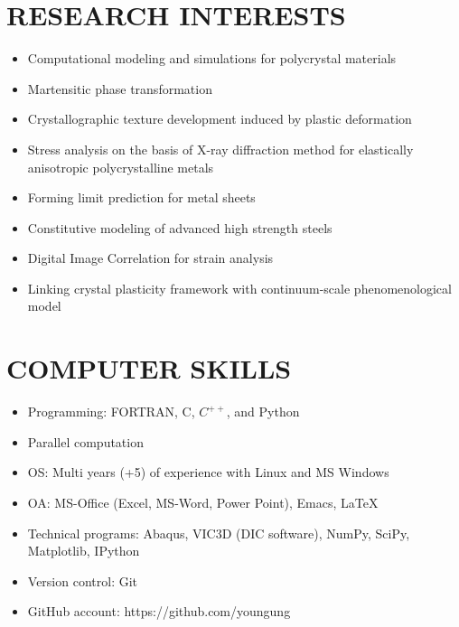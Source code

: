 \documentclass{res}
\begin{document}
\begin{resume}
  \section{RESEARCH INTERESTS}
  \begin{itemize}
  \item Computational modeling and simulations for polycrystal materials
  \item Martensitic phase transformation
  \item Crystallographic texture development induced by plastic deformation
  \item Stress analysis on the basis of X-ray diffraction method for elastically anisotropic polycrystalline metals
  \item Forming limit prediction for metal sheets
  \item Constitutive modeling of advanced high strength steels
  \item Digital Image Correlation for strain analysis
  \item Linking crystal plasticity framework with continuum-scale phenomenological model
  \end{itemize}

  \section{COMPUTER SKILLS}
  \begin{itemize}
  \item Programming: FORTRAN, C, $C^{++}$, and Python
  \item Parallel computation
  \item OS: Multi years (+5) of experience with Linux and MS Windows
  \item OA: MS-Office (Excel, MS-Word, Power Point), Emacs, \LaTeX
  \item Technical programs: Abaqus, VIC3D (DIC software), NumPy, SciPy, Matplotlib, IPython
  \item Version control: Git
  \item GitHub account: https://github.com/youngung
  \end{itemize}


\end{resume}
\end{document}
